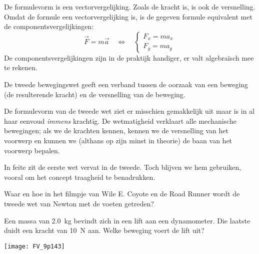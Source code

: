 \documentclass{ximera}
\begin{document}
\begin{remark}{De formulevorm is een vectorvergelijking.} Zoals de kracht is, is ook de versnelling. Omdat de formule een vectorvergelijking is, is de gegeven formule equivalent met de componentsvergelijkingen:
	\begin{equation*}
		\vec{F}=m\vec{a}\quad\Leftrightarrow\quad
		\begin{cases}
			F_x=ma_x \\
			F_y=ma_y
		\end{cases}
	\end{equation*}
	De componentsvergelijkingen zijn in de praktijk handiger, er valt algebra\"isch mee te rekenen.
\end{remark}

De tweede bewegingswet geeft een verband tussen de oorzaak van een beweging (de resulterende kracht) en de versnelling van de beweging.

De formulevorm van de tweede wet ziet er misschien gemakkelijk uit maar is in al haar eenvoud \emph{immens} krachtig. De wetmatigheid verklaart alle mechanische bewegingen; als we de krachten kennen, kennen we de versnelling van het voorwerp en kunnen we (althans op zijn minst in theorie) de baan van het voorwerp bepalen.

In feite zit de eerste wet vervat in de tweede. Toch blijven we hem gebruiken, vooral om het concept traagheid te benadrukken.

\begin{denkvraag*}{}
	Waar en hoe in het filmpje van Wile E. Coyote en de Road Runner wordt de tweede wet van Newton met de voeten getreden?
	\begin{center}
	\end{center}
\end{denkvraag*}

\begin{exercise}
	Een massa van \SI{2,0}{kg} bevindt zich in een lift aan een dynamometer. Die laatste duidt een kracht van \SI{10}{N} aan. Welke beweging voert de lift uit?

	\begin{minipage}[c]{.8\linewidth}
	\begin{multipleChoice}
	\end{multipleChoice}
	\end{minipage}
	\hfill
	\begin{minipage}{.15\linewidth}
	\begin{image}
		\texttt{[image: FV\_9p143]}%
	\end{image}
	\end{minipage}
\end{exercise}
\end{document}
